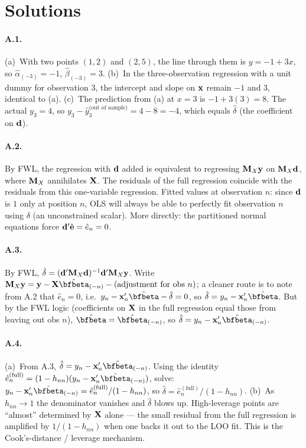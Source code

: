 \documentclass{article}
\begin{document}
\newpage

\section*{Solutions}

\paragraph{A.1.}  (a)~With two points $(1,2)$ and $(2,5)$, the line through them is $y = -1 + 3x$, so $\hat\alpha_{(-3)} = -1$, $\hat\beta_{(-3)} = 3$.  (b)~In the three-observation regression with a unit dummy for observation $3$, the intercept and slope on ${\mathbf x}$ remain $-1$ and $3$, identical to (a).  (c)~The prediction from (a) at $x = 3$ is $-1 + 3(3) = 8$.  The actual $y_3 = 4$, so $y_3 - \hat y_3^{\text{(out of sample)}} = 4 - 8 = -4$, which equals $\hat\delta$ (the coefficient on ${\mathbf d}$).

\paragraph{A.2.}  By FWL, the regression with ${\mathbf d}$ added is equivalent to regressing ${\mathbf M}_X {\mathbf y}$ on ${\mathbf M}_X {\mathbf d}$, where ${\mathbf M}_X$ annihilates ${\mathbf X}$.  The residuals of the full regression coincide with the residuals from this one-variable regression.  Fitted values at observation $n$: since ${\mathbf d}$ is $1$ only at position $n$, OLS will always be able to perfectly fit observation $n$ using $\delta$ (an unconstrained scalar).  More directly: the partitioned normal equations force ${\mathbf d}'\hat{{\mathbf e}} = \hat e_n = 0$.

\paragraph{A.3.}  By FWL, $\hat\delta = ({\mathbf d}'{\mathbf M}_X{\mathbf d})^{-1}{\mathbf d}'{\mathbf M}_X{\mathbf y}$.  Write $\bfM_X\bfy = \bfy - \bfX\hat\bfbeta_{(-n)} - (\text{adjustment for obs } n)$; a cleaner route is to note from A.2 that $\hat e_n = 0$, i.e.\ $y_n - \bm{x}_n'\hat\bfbeta - \hat\delta = 0$, so $\hat\delta = y_n - \bm{x}_n'\hat\bfbeta$.  But by the FWL logic (coefficients on ${\mathbf X}$ in the full regression equal those from leaving out obs $n$), $\hat\bfbeta = \hat\bfbeta_{(-n)}$, so $\hat\delta = y_n - \bm{x}_n'\hat\bfbeta_{(-n)}$.

\paragraph{A.4.}  (a)~From A.3, $\hat\delta = y_n - \bm{x}_n'\hat\bfbeta_{(-n)}$.  Using the identity $\hat e_n^{(\text{full})} = (1-h_{nn})(y_n - \bm{x}_n'\hat\bfbeta_{(-n)})$, solve: $y_n - \bm{x}_n'\hat\bfbeta_{(-n)} = \hat e_n^{(\text{full})}/(1 - h_{nn})$, so $\hat\delta = \hat e_n^{(\text{full})}/(1 - h_{nn})$.  (b)~As $h_{nn} \to 1$ the denominator vanishes and $\hat\delta$ blows up.  High-leverage points are ``almost'' determined by ${\mathbf X}$ alone --- the small residual from the full regression is amplified by $1/(1-h_{nn})$ when one backs it out to the LOO fit.  This is the Cook's-distance / leverage mechanism.
\end{document}
